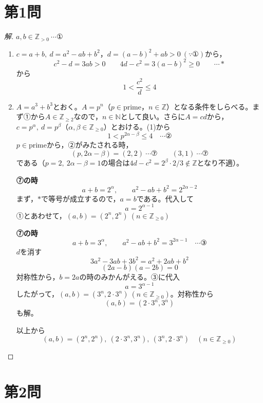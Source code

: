 \documentclass[../main.tex]{subfiles}
\begin{document}
\section*{第1問}

\begin{proof}[解]
  $a,b\in\mathbb{Z}_{>0}\ \cdots$①

  \begin{enumerate}
    \item[(1)] $c=a+b,\ d=a^2-ab+b^2$，$d=(a-b)^2+ab>0\ (\because①)$から，
      \[
        c^2-d=3ab>0 \qquad 4d-c^2=3(a-b)^2\ge0 \qquad \cdots *
      \]
      から
      \[
        1<\frac{c^2}{d}\le4
      \]

    \item[(2)] $A=a^3+b^3$とおく。$A=p^n$（$p\in\text{prime}$，$n\in\mathbb{Z}$）となる条件をしらべる。まず①から$A\in\mathbb{Z}_{\ge2}$なので，$n\in\mathbb{N}$として良い。さらに$A=cd$から，$c=p^\alpha,\ d=p^\beta$（$\alpha,\beta\in\mathbb{Z}_{\ge0}$）とおける。(1)から
      \[
        1<p^{2\alpha-\beta}\le4 \quad\cdots\text{②}
      \]
      $p\in\text{prime}$から，②がみたされる時，
      \[
        (p,2\alpha-\beta)=(2,2)\ \cdots\text{⑦} \qquad (3,1)\ \cdots\text{⑦}
      \]
      である（$p=2,\ 2\alpha-\beta=1$の場合は$4d-c^2=2^\beta\cdot2/3\not\in\mathbb{Z}$となり不適）。

      \textbf{⑦の時}
      \[
        a+b=2^\alpha, \qquad a^2-ab+b^2=2^{2\alpha-2}
      \]
      まず，$*$で等号が成立するので，$a=b$である。代入して
      \[
        a=2^{\alpha-1}
      \]
      ①とあわせて，$(a,b)=(2^n,2^n)\ (n\in\mathbb{Z}_{\ge0})$

      \textbf{⑦の時}
      \[
        a+b=3^\alpha, \qquad a^2-ab+b^2=3^{2\alpha-1} \quad\cdots\text{③}
      \]
      $d$を消す
      \[
        3a^2-3ab+3b^2=a^2+2ab+b^2
      \]
      \[
        (2a-b)(a-2b)=0
      \]
      対称性から，$b=2a$の時のみかんがえる。③に代入
      \[
        a=3^{\alpha-1}
      \]
      したがって，$(a,b)=(3^n,2\cdot3^n)\ (n\in\mathbb{Z}_{\ge0})$。対称性から
      \[
        (a,b)=(2\cdot3^n,3^n)
      \]
      も解。

      以上から
      \[
        (a,b)=(2^n,2^n),\ (2\cdot3^n,3^n),\ (3^n,2\cdot3^n)\quad(n\in\mathbb{Z}_{\ge0})
      \]
  \end{enumerate}
\end{proof}

\newpage

\section*{第2問}
\end{document}
